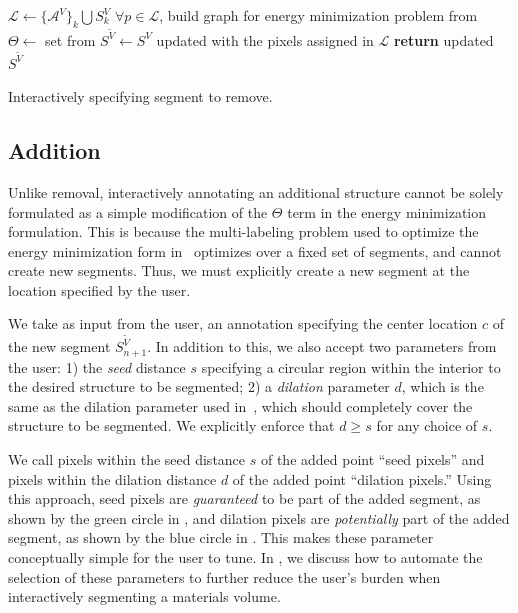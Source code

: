 \documentclass[]{spie}  %
\begin{document}
\begin{algorithm}[!t]
  \centering
  \algrenewcommand{}
  \begin{algorithmic}[1]
    \State $\mathcal{L} \gets \{\mathcal{A}^V\}_k \bigcup S^V_k$
    \State $\forall p \in \mathcal{L}$, build graph for energy minimization problem from~\cite{waggoner:11}
    \State $\Theta \gets $ set from 
    \State $S^{\tilde{V}} \gets S^V$ updated with the pixels assigned in $\mathcal{L}$
    \State \textbf{return} updated $S^{\tilde{V}}$
    \EndFunction
  \end{algorithmic}
  \caption{Interactively specifying segment to remove.}
  \label{alg:remove}
\end{algorithm}

\subsection{Addition}
\label{sec:addition}

Unlike removal, interactively annotating an additional structure
cannot be solely formulated as a simple modification of the $\Theta$
term in the energy minimization formulation.  This is because the
multi-labeling problem used to optimize the energy minimization form
in~\cite{waggoner:11} optimizes over a fixed set of segments, and
cannot create new segments.  Thus, we must explicitly create a new
segment at the location specified by the user.

We take as input from the user, an annotation specifying the center
location $c$ of the new segment $S^{\tilde{V}}_{n+1}$.  In addition to
this, we also accept two parameters from the user: 1) the \emph{seed}
distance $s$ specifying a circular region within the interior to the
desired structure to be segmented; 2) a \textit{dilation} parameter
$d$, which is the same as the dilation parameter used
in~\cite{waggoner:11}, which should completely cover the structure to
be segmented.  We explicitly enforce that $d \geq s$ for any choice of
$s$.

We call pixels within the seed distance $s$ of the added point ``seed
pixels'' and pixels within the dilation distance $d$ of the added
point ``dilation pixels.''  Using this approach, seed pixels are
\emph{guaranteed} to be part of the added segment, as shown by the
green circle in , and dilation pixels are
\emph{potentially} part of the added segment, as shown by the blue
circle in .  This makes these parameter
conceptually simple for the user to tune.  In , we discuss
how to automate the selection of these parameters to further reduce
the user's burden when interactively segmenting a materials volume.
\end{document}
